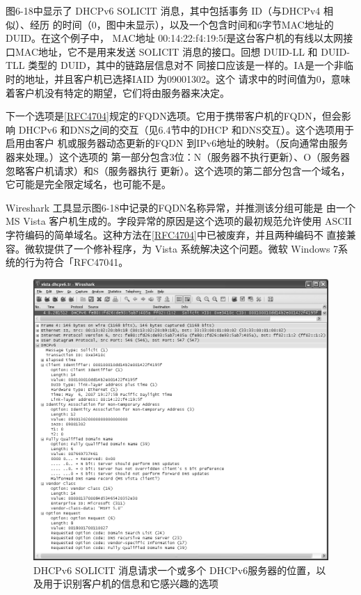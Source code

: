 图6-18中显示了 DHCPv6 SOLICIT 消息，其中包括事务 ID（与DHCPv4 相似）、经历
的时间（0，图中未显示），以及一个包含时间和6字节MAC地址的DUID。在这个例子中，
MAC地址 00:14:22:f4:19:5f是这台客户机的有线以太网接口MAC地址，它不是用来发送
SOLICIT 消息的接口。回想 DUID-LL 和 DUID-TLL 类型的 DUID，其中的链路层信息对不
同接口应该是一样的。IA是一个非临时的地址，并且客户机已选择IAID 为09001302。这个
请求中的时间值为0，意味着客户机没有特定的期望，它们将由服务器来决定。

下一个选项是\href{https://www.rfc-editor.org/rfc/rfc4704}{\href{https://www.rfc-editor.org/rfc/rfc4704}{[RFC4704]}}规定的FQDN选项。它用于携带客户机的FQDN，但会影响
DHCPv6 和DNS之间的交互（见6.4节中的DHCP 和DNS交互）。这个选项用于启用由客户
机或服务器动态更新的FQDN 到IPv6地址的映射。（反向通常由服务器来处理。）这个选项的
第一部分包含3位：N（服务器不执行更新）、O（服务器忽略客户机请求）和S（服务器执行
更新）。这个选项的第二部分包含一个域名，它可能是完全限定域名，也可能不是。

\begin{tcolorbox}
  Wireshark 工具显示图6-18中记录的FQDN名称异常，并推测该分组可能是
  由一个 MS Vista 客户机生成的。字段异常的原因是这个选项的最初规范允许使用
  ASCII
  字符编码的简单域名。这种方法在\href{https://www.rfc-editor.org/rfc/rfc4704}{\href{https://www.rfc-editor.org/rfc/rfc4704}{[RFC4704]}}中已被废弃，并且两种编码不
  直接兼容。微软提供了一个修补程序，为 Vista 系统解决这个问题。微软 Windows
  7系统的行为符合「RFC47041。
\end{tcolorbox}

\begin{figure}[H]
  \centering
  \includegraphics[scale=0.5]{imgs/6/6-18.png}
  \caption{DHCPv6 SOLICIT 消息请求一个或多个 DHCPv6服务器的位置，以及用于识别客户机的信息和它感兴趣的选项}
\end{figure}

